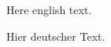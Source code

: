 \begin{center}\large{}\end{center}

Here english text.

\begin{center}\large{}\end{center}

Hier deutscher Text.

\newpage
